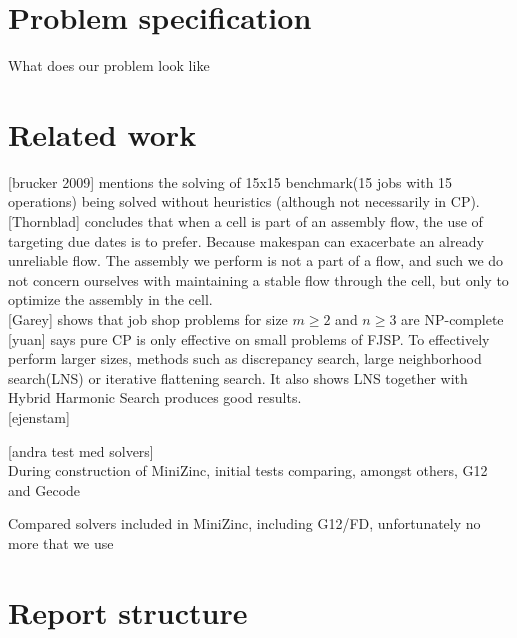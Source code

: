 \section{Problem specification}
What does our problem look like

\section{Related work}
[brucker 2009] mentions the solving of 15x15 benchmark(15 jobs with 15 operations) being solved without heuristics (although not necessarily in CP).\cite{brucker_2009}
\\

[Thornblad] concludes that when a cell is part of an assembly flow, the use of targeting due dates is to prefer. Because makespan can exacerbate an already unreliable flow. The assembly we perform is not a part of a flow, and such we do not concern ourselves with maintaining a stable flow through the cell, but only to optimize the assembly in the cell.\cite{thornblad_2013}
\\

[Garey] shows that job shop problems for size $m \geq 2$ and $n \geq 3$ are NP-complete \cite{garey_1976}
\\

[yuan] says pure CP is only effective on small problems of FJSP. To effectively perform larger sizes, methods such as discrepancy search, large neighborhood search(LNS) or iterative flattening search. It also shows LNS together with Hybrid Harmonic Search produces good results.\cite{yuan_2013}
\\

[ejenstam]\cite{ejenstam_2014}

[andra test med solvers]\\
During construction of MiniZinc, initial tests comparing, amongst others, G12 and Gecode\cite{mz_paper}

Compared solvers included in MiniZinc, including G12/FD, unfortunately no more that we use\cite{nicta_2964}

\section{Report structure}
